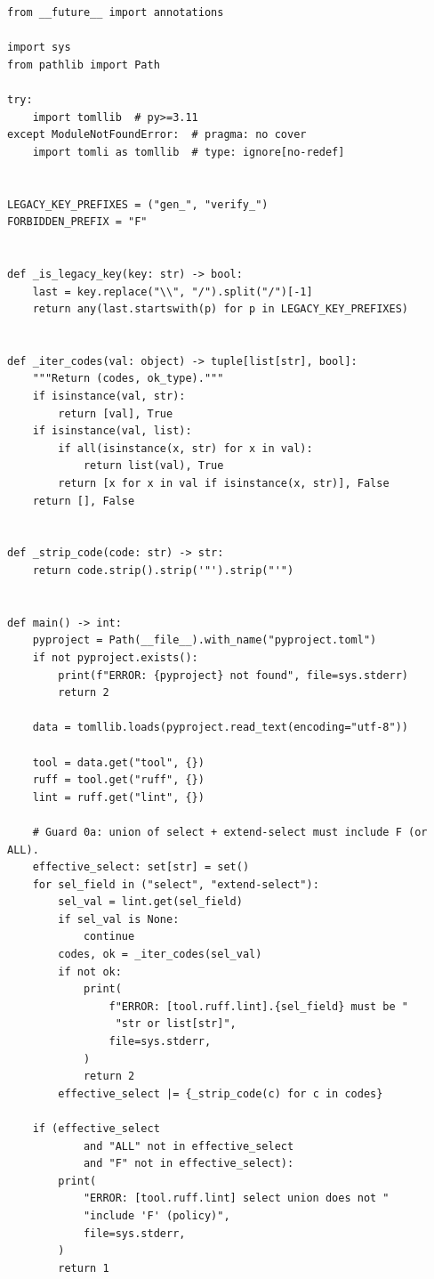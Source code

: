 \documentclass[11pt,a4paper]{article}
\begin{document}
\begin{lstlisting}[caption={\texttt{ci\_lint\_policy.py} (158 lines).},label={lst:policy-full}]
from __future__ import annotations

import sys
from pathlib import Path

try:
    import tomllib  # py>=3.11
except ModuleNotFoundError:  # pragma: no cover
    import tomli as tomllib  # type: ignore[no-redef]


LEGACY_KEY_PREFIXES = ("gen_", "verify_")
FORBIDDEN_PREFIX = "F"


def _is_legacy_key(key: str) -> bool:
    last = key.replace("\\", "/").split("/")[-1]
    return any(last.startswith(p) for p in LEGACY_KEY_PREFIXES)


def _iter_codes(val: object) -> tuple[list[str], bool]:
    """Return (codes, ok_type)."""
    if isinstance(val, str):
        return [val], True
    if isinstance(val, list):
        if all(isinstance(x, str) for x in val):
            return list(val), True
        return [x for x in val if isinstance(x, str)], False
    return [], False


def _strip_code(code: str) -> str:
    return code.strip().strip('"').strip("'")


def main() -> int:
    pyproject = Path(__file__).with_name("pyproject.toml")
    if not pyproject.exists():
        print(f"ERROR: {pyproject} not found", file=sys.stderr)
        return 2

    data = tomllib.loads(pyproject.read_text(encoding="utf-8"))

    tool = data.get("tool", {})
    ruff = tool.get("ruff", {})
    lint = ruff.get("lint", {})

    # Guard 0a: union of select + extend-select must include F (or ALL).
    effective_select: set[str] = set()
    for sel_field in ("select", "extend-select"):
        sel_val = lint.get(sel_field)
        if sel_val is None:
            continue
        codes, ok = _iter_codes(sel_val)
        if not ok:
            print(
                f"ERROR: [tool.ruff.lint].{sel_field} must be "
                 "str or list[str]",
                file=sys.stderr,
            )
            return 2
        effective_select |= {_strip_code(c) for c in codes}

    if (effective_select
            and "ALL" not in effective_select
            and "F" not in effective_select):
        print(
            "ERROR: [tool.ruff.lint] select union does not "
            "include 'F' (policy)",
            file=sys.stderr,
        )
        return 1


\end{lstlisting}
\end{document}

